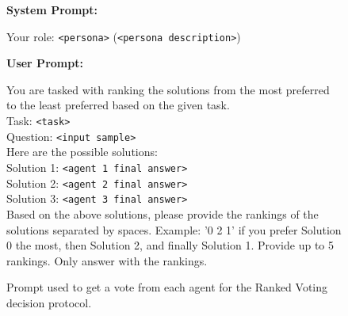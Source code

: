 \begin{figure}[H]
    \centering
    \begin{combinedprompt}
    \textbf{System Prompt:} \\
    \begingroup
    \colorbox{systemcolor}{\parbox{\dimexpr\linewidth-2\fboxsep\relax}{
    Your role: \texttt{<persona>} (\texttt{<persona description>})
    }}
    \endgroup

    \vspace{0.4em} %

    \textbf{User Prompt:} \\
    \begingroup
    \colorbox{usercolor}{\parbox{\dimexpr\linewidth-2\fboxsep\relax}{
    You are tasked with ranking the solutions from the most preferred to the least preferred based on the given task.\\
    Task: \texttt{<task>}\\
    Question: \texttt{<input sample>}\\
    Here are the possible solutions:\\
    Solution 1: \texttt{<agent 1 final answer>}\\
    Solution 2: \texttt{<agent 2 final answer>}\\
    Solution 3: \texttt{<agent 3 final answer>}\\
    Based on the above solutions, please provide the rankings of the solutions separated by spaces. Example: '0 2 1' if you prefer Solution 0 the most, then Solution 2, and finally Solution 1. Provide up to 5 rankings. Only answer with the rankings.
    }}
    \endgroup
\end{combinedprompt}
    \caption{Prompt used to get a vote from each agent for the Ranked Voting decision protocol.}
    \label{fig:ranked_voting_prompt}
\end{figure}







